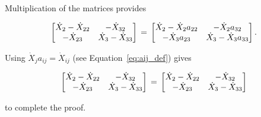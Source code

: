 \noindent Multiplication of the matrices provides

\begin{equation} \label{eq:Xdifference2Proof-3}
\begin{bmatrix} 	\dot{X}_{2} - \dot{X}_{22} & - \dot{X}_{32}	\\
				- \dot{X}_{23} & \dot{X}_{3} - \dot{X}_{33}	\\
\end{bmatrix} \\
= \\
\begin{bmatrix} 	\dot{X}_{2} - \dot{X}_2 a_{22} & - \dot{X}_2 a_{32}	\\
				- \dot{X}_3 a_{23} & \dot{X}_{3} - \dot{X}_3 a_{33}	\\
\end{bmatrix}.
\end{equation}

\noindent Using $\dot{X}_j a_{ij} = \dot{X}_{ij}$ (see Equation~\ref{eq:aij_def}) gives

\begin{equation} \label{eq:Xdifference2Proof-4}
\begin{bmatrix} 	\dot{X}_{2} - \dot{X}_{22} & - \dot{X}_{32}	\\
				- \dot{X}_{23} & \dot{X}_{3} - \dot{X}_{33}	\\
\end{bmatrix} \\
= \\
\begin{bmatrix} 	\dot{X}_{2} - \dot{X}_{22} & - \dot{X}_{32}	\\
				- \dot{X}_{23} & \dot{X}_{3} - \dot{X}_{33}	\\
\end{bmatrix}
\end{equation}

\noindent to complete the proof.



